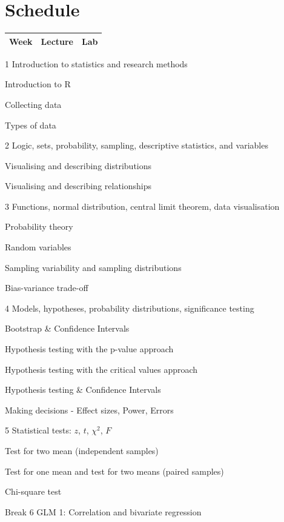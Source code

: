 \documentclass[]{book}
\begin{document}
\hypertarget{schedule}{%
\section*{Schedule}\label{schedule}}

\begin{longtable}[]{@{}lll@{}}
\toprule
Week & Lecture & Lab\tabularnewline
\midrule
\endhead
\bottomrule
\end{longtable}

\textbar{} 1 \textbar{} Introduction to statistics and research methods \textbar{}

Introduction to R

Collecting data

Types of data

\textbar{}
\textbar{} 2 \textbar{} Logic, sets, probability, sampling, descriptive statistics, and variables \textbar{}

Visualising and describing distributions

Visualising and describing relationships

\textbar{}
\textbar{} 3 \textbar{} Functions, normal distribution, central limit theorem, data visualisation \textbar{}

Probability theory

Random variables

Sampling variability and sampling distributions

Bias-variance trade-off

\textbar{}
\textbar{} 4 \textbar{} Models, hypotheses, probability distributions, significance testing \textbar{}

Bootstrap \& Confidence Intervals

Hypothesis testing with the p-value approach

Hypothesis testing with the critical values approach

Hypothesis testing \& Confidence Intervals

Making decisions - Effect sizes, Power, Errors

\textbar{}
\textbar{} 5 \textbar{} Statistical tests: \(z\), \(t\), \(\chi^2\), \(F\) \textbar{}

Test for two mean (independent samples)

Test for one mean and test for two means (paired samples)

Chi-square test

\textbar{}
\textbar{} Break \textbar{} \textbar{} \textbar{}
\textbar{} 6 \textbar{} GLM 1: Correlation and bivariate regression \textbar{}
\end{document}
